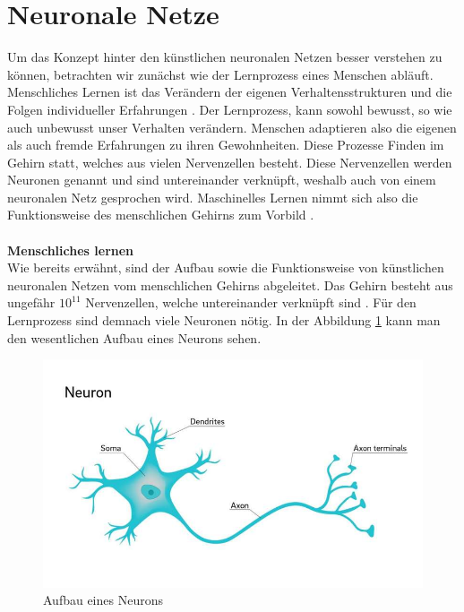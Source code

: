   \section{Neuronale Netze}\label{s.neuronalenetze}
Um das Konzept hinter den künstlichen neuronalen Netzen besser verstehen zu können, betrachten wir zunächst wie der Lernprozess eines Menschen abläuft. Menschliches Lernen ist das Verändern der eigenen Verhaltensstrukturen und die Folgen individueller Erfahrungen \cite{hoffmann2016lern}. Der Lernprozess, kann sowohl bewusst, so wie auch unbewusst unser Verhalten verändern. Menschen adaptieren also die eigenen als auch fremde Erfahrungen zu ihren Gewohnheiten. Diese Prozesse Finden im Gehirn statt, welches aus vielen Nervenzellen besteht. Diese Nervenzellen werden Neuronen genannt und sind untereinander verknüpft, weshalb auch von einem neuronalen Netz gesprochen wird. Maschinelles Lernen nimmt sich also die Funktionsweise des menschlichen Gehirns zum Vorbild \cite[]{ertel2013grundkurs}.\\\\
\textbf{Menschliches lernen}\\
Wie bereits erwähnt, sind der Aufbau sowie die Funktionsweise von künstlichen neuronalen Netzen vom menschlichen Gehirns abgeleitet. Das Gehirn besteht aus ungefähr $10^{11}$ Nervenzellen, welche untereinander verknüpft sind \cite[265ff.]{ertel2013grundkurs}. Für den Lernprozess sind demnach viele Neuronen nötig. In der Abbildung \ref{img:neuron} kann man den wesentlichen Aufbau eines Neurons sehen.
\begin{figure}
	[h]
	\centering
	\includegraphics[scale=0.7]{Sources/neuron.jpg}
	\caption{Aufbau eines Neurons \cite{neuron2018UoC}}
	\label{img:neuron}
\end{figure}\\
